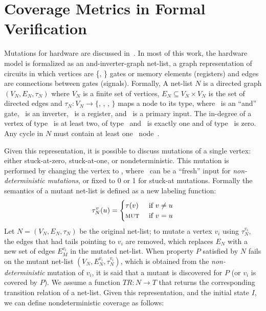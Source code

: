 \section{Coverage Metrics in Formal Verification}

Mutations for hardware are discussed in~\cite{chockler2010coverage,Kupferman:2006:SCF,kupferman_theory_2008}.  In most of this work, the hardware model is formalized as an and-inverter-graph net-list, a graph representation of circuits in which vertices are \{\andnode, \invnode\} gates or memory elements (registers) and edges are connections between gates (signals).  Formally, A net-list $N$ is a directed graph $(V_N,E_N, \tau_N)$ where $V_N$ is a finite set of vertices, $E_N \subseteq V_N \times V_N$ is the set of directed edges and $\tau_N : V_N \rightarrow \{$\andnode, \invnode, \regnode, \inpnode$\}$ maps a node to its type, where \andnode\ is an ``and'' gate, \invnode\ is an inverter, \regnode\ is a register, and \inpnode\ is a primary input.  The in-degree of a vertex of type \andnode\ is at least two, of type \invnode\ and \regnode\ is exactly one and of type \inpnode\ is zero. Any cycle in $N$ must contain at least one \regnode\ node~\cite{chockler2010coverage}.

Given this representation, it is possible to discuss mutations of a single vertex: either stuck-at-zero, stuck-at-one, or nondeterministic.  This mutation is performed by changing the vertex to \mutnode, where \mutnode\ can be a ``fresh'' input for \emph{non-deterministic mutations}, or fixed to 0 or 1 for stuck-at mutations. Formally the semantics of a mutant net-list is defined as a new labeling function:
\[ \tau^{v}_{N}(u) = \begin{cases}
    \tau(v) & \textrm{ if $v \neq u$} \\
    \textrm{{\sc mut}}   & \textrm{ if $v = u$}
\end{cases}  \]
\noindent
Let  $N = (V_N,E_N, \tau_N)$ be the original net-list; to mutate a vertex $v_i$ using $\tau^{v_i}_{N}$, the  edges that had tails pointing to $v_i$ are removed,
 which replaces $E_N$ with a new set of edges $E^{v_i}_M$ in the mutated net-list.
When property $P$ satisfied by $N$ fails on the mutant net-list $(V_N, E^{v_i}_N, \tau^{v_i}_{N})$, which is obtained from the \emph{non-deterministic} mutation of $v_i$, it is said that a mutant is discovered for $P$ (or $v_i$ is covered by $P$).
We assume a function $TR : N \rightarrow T$ that returns the corresponding transition relation of a net-list.
Given this representation, and the initial state $I$, we can define nondeterministic coverage as follows:

